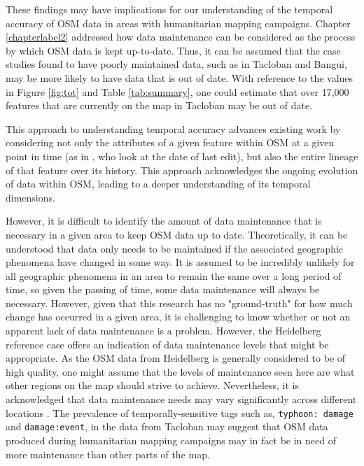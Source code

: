 These findings may have implications for our understanding of the temporal accuracy of OSM data in areas with humanitarian mapping campaigns. Chapter \ref{chapterlabel2} addressed how data maintenance can be considered as the process by which OSM data is kept up-to-date. Thus, it can be assumed that the case studies found to have poorly maintained data, such as in Tacloban and Bangui, may be more likely to have data that is out of date. With reference to the values in Figure \ref{fig:tot} and Table \ref{tab:summary}, one could estimate that over 17,000 features that are currently on the map in Tacloban may be out of date.

This approach to understanding temporal accuracy advances existing work by considering not only the attributes of a given feature within OSM at a given point in time (as in \textcite{barron_comprehensive_2014}, who look at the date of last edit), but also the entire lineage of that feature over its history. This approach acknowledges the ongoing evolution of data within OSM, leading to a deeper understanding of its temporal dimensions. 

However, it is difficult to identify the amount of data maintenance that is necessary in a given area to keep OSM data up to date. Theoretically, it can be understood that data only needs to be maintained if the associated geographic phenomena have changed in some way. It is assumed to be incredibly unlikely for all geographic phenomena in an area to remain the same over a long period of time, so given the passing of time, some data maintenance will always be necessary. However, given that this research has no "ground-truth" for how much change has occurred in a given area, it is challenging to know whether or not an apparent lack of data maintenance is a problem. However, the Heidelberg reference case offers an indication of data maintenance levels that might be appropriate. As the OSM data from Heidelberg is generally considered to be of high quality, one might assume that the levels of maintenance seen here are what other regions on the map should strive to achieve. Nevertheless, it is acknowledged that data maintenance needs may vary significantly across different locations \parencite{quattrone_work_2017}. The prevalence of temporally-sensitive tags such as, \texttt{typhoon: damage} and \texttt{damage:event}, in the data from Tacloban may suggest that OSM data produced during humanitarian mapping campaigns may in fact be in need of more maintenance than other parts of the map. 

